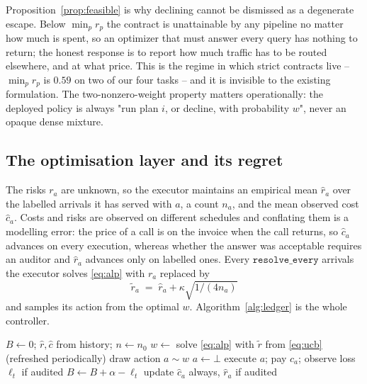 Proposition~\ref{prop:feasible} is why declining cannot be dismissed as
a degenerate escape. Below $\min_p r_p$ the contract is unattainable by
any pipeline no matter how much is spent, so an optimizer that must
answer every query has nothing to return; the honest response is to
report how much traffic has to be routed elsewhere, and at what price.
This is the regime in which strict contracts live -- $\min_p r_p$ is
$0.59$ on two of our four tasks -- and it is invisible to the existing
formulation. The two-nonzero-weight property matters
operationally: the deployed policy is always "run plan $i$, or decline,
with probability $w$", never an opaque dense mixture.

\subsection{The optimisation layer and its regret}
\label{sec:optimise}

The risks $r_a$ are unknown, so the executor maintains an empirical mean
$\hat r_a$ over the labelled arrivals it has served with $a$, a count
$n_a$, and the mean observed cost $\hat c_a$. Costs and risks are
observed on different schedules and conflating them is a modelling
error: the price of a call is on the invoice when the call returns, so
$\hat c_a$ advances on every execution, whereas whether the answer was
acceptable requires an auditor and $\hat r_a$ advances only on labelled
ones. Every $\texttt{resolve\_every}$ arrivals the executor solves
\eqref{eq:alp} with $r_a$ replaced by
\begin{equation}
\label{eq:ucb}
\tilde r_a \;=\; \hat r_a + \kappa \sqrt{1/(4 n_a)}
\end{equation}
and samples its action from the optimal $w$. Algorithm~\ref{alg:ledger}
is the whole controller.

\begin{algorithm}[t]
\caption{Ledger-gated execution}
\label{alg:ledger}
\begin{algorithmic}[1]
\STATE $B \leftarrow 0$; $\hat r,\hat c$ from history; $n \leftarrow n_0$
     \STATE $w \leftarrow$ solve \eqref{eq:alp} with $\tilde r$ from
            \eqref{eq:ucb} \quad(refreshed periodically)
     \STATE draw action $a \sim w$
  \ELSE
     \STATE $a \leftarrow \bot$ \quad{}
  \ENDIF
  \STATE execute $a$; pay $c_a$; observe loss $\ell_t$ if audited
  \STATE $B \leftarrow B + \alpha - \ell_t$
  \STATE update $\hat c_a$ always, $\hat r_a$ if audited
\ENDFOR
\end{algorithmic}
\end{algorithm}

